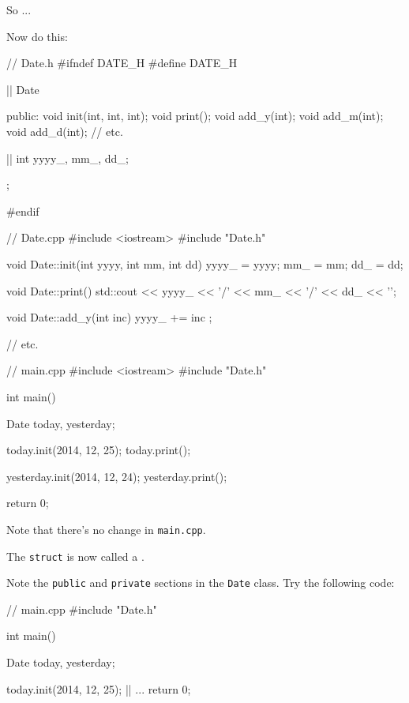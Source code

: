 So ...


\newpage{}

Now do this:

\begin{consolethree}[escapeinside=||]
// Date.h
#ifndef DATE_H
#define DATE_H

|| Date
{
public:
    void init(int, int, int);
    void print();
    void add_y(int);
    void add_m(int);
    void add_d(int);
    // etc.

||
    int yyyy_, mm_, dd_;
};

#endif
\end{consolethree}

\begin{consolethree}[escapeinside=||]
// Date.cpp
#include <iostream>
#include "Date.h"

void Date::init(int yyyy, int mm, int dd)
{
    yyyy_ = yyyy;
    mm_ = mm;
    dd_ = dd;
}

void Date::print()
{
    std::cout << yyyy_ << '/'
              << mm_ << '/'
              << dd_ << '\n';
}

void Date::add_y(int inc)
{
    yyyy_ += inc ;
}

// etc.
\end{consolethree}

\begin{consolethree}[escapeinside=||]
// main.cpp
#include <iostream>
#include "Date.h"

int main()
{
    Date today, yesterday;
    
    today.init(2014, 12, 25);
    today.print();
    
    yesterday.init(2014, 12, 24);
    yesterday.print();
    
    return 0;
}
\end{consolethree}

Note that there's no change in \texttt{main.cpp}.

The \texttt{struct} is now called a .

Note the \texttt{public} and \texttt{private} sections in the \texttt{Date}
class. Try the following code:

\begin{consolethree}[escapeinside=||]
// main.cpp
#include "Date.h"

int main()
{
    Date today, yesterday;
    
    today.init(2014, 12, 25);
    ||
    ...
    return 0;
}
\end{consolethree}

